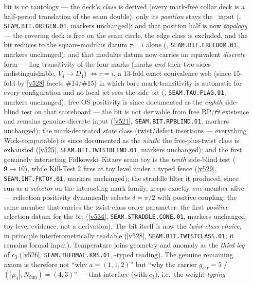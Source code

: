 \documentclass[11pt,a4paper]{article}
\newcommand{\cthree}{c_3}
\newcommand{\gcar}{g_{\mathrm{car}}}
\newcommand{\Nfam}{N_{\mathrm{fam}}}
\begin{document}
bit is no tautology --- the deck's \emph{class} is derived (every mark-free collar deck is a
half-period translation of the seam double), only its \emph{position} stays the \mC\ input
(, \texttt{SEAM.BIT.ORIGIN.01}, markers unchanged); and that
position half is now \emph{topology} --- the covering deck is free on the seam circle, the
edge class is excluded, and the bit reduces to the square-modulus datum $\tau=i$ alone
(, \texttt{SEAM.BIT.FREEDOM.01}, markers unchanged); and that
modulus datum now carries an equivalent \emph{discrete} form --- flag transitivity of the four marks
(marks \emph{and} their two sides indistinguishable, $V_4\to D_4$) $\iff\tau=i$, a $13$-fold exact
equivalence web (since $15$-fold by \vref{v528} facets \#14/\#15) in which bare mark-transitivity is
automatic for every configuration and no local
jet sees the side bit (, \texttt{SEAM.TAU.FLAG.01}, markers
unchanged); free OS positivity is since documented as the \emph{eighth} side-blind test on that
scoreboard --- the bit is not derivable from free RP/$\Theta$ existence and remains genuine
discrete input (\vref{v521}, \texttt{SEAM.BIT.RPBLIND.01}, markers unchanged); the
mark-decorated \emph{state} class (twist/defect insertions --- everything Wick-computable)
is since documented as the \emph{ninth}: the free-plus-twist class is exhausted
(\vref{v525}, \texttt{SEAM.BIT.TWISTBLIND.01}, markers unchanged); and the first genuinely
interacting Fidkowski--Kitaev seam toy is the \emph{tenth} side-blind test ($9\to10$), while
Kill-Test 2 fires at toy level under a typed fence (\vref{v529}, \texttt{SEAM.INT.FKTOY.01},
markers unchanged); the straddle filter it produced, since run as a \emph{selector} on the
interacting mark family, keeps exactly \emph{one} member alive --- reflection positivity
dynamically selects $\delta=\pi/2$ with positive coupling, the same member that carries the
twist-class order parameter: the first \emph{positive} selection datum for the bit
(\vref{v534}, \texttt{SEAM.STRADDLE.CONE.01}, markers unchanged; toy-level evidence,
not a derivation). The bit itself is now the \emph{twist-class choice}, in principle
interferometrically readable (\vref{v528}, \texttt{SEAM.BIT.TWISTCLASS.01}; it remains formal
input). Temperature joins geometry and anomaly as the \emph{third leg} of $\cthree$
(\vref{v526}, \texttt{SEAM.THERMAL.KMS.01}, \mC-typed reading).
The genuine remaining axiom is therefore not ``why $a=(1,1,2)$'' but ``why the carrier
$\gcar=5$ / $(|\mu_4|,\Nfam)=(4,3)$'' --- that interface (with $\cthree$), i.e.\ the weight-\emph{typing}
\end{document}
